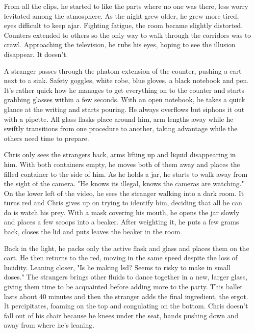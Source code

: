         From all the clips, he started to like the parts where no one was there, less worry levitated among the atmosphere. As the night grew
    older, he grew more tired, eyes difficult to keep ajar. Fighting fatigue, the room became slightly distorted. Counters extended to others so
    the only way to walk through the corridors was to crawl. Approaching the television, he rubs his eyes, hoping to see the illusion disappear.
    It doesn't.

        A stranger passes through the phatom extension of the counter, pushing a cart next to a sink. Safety goggles, white robe, blue gloves,
    a black notebook and pen. It's rather quick how he manages to get everything on to the counter and starts grabbing glasses within a few 
    seconds. With an open notebook, he takes a quick glance at the writing and starts pouring. He always overflows but siphons it out with a
    pipette.  All glass flasks place around him, arm lengths away while he swiftly transitions from one procedure to another, taking advantage
    while the others need time to prepare. 

        Chris only sees the strangers back, arms lifting up and liquid disappearing in him. With both containers empty, he moves both of them
    away and places the filled container to the side of him. As he holds a jar, he starts to walk away from the sight of the camera. "He knows
    its illegal, knows the cameras are watching." On the lower left of the video, he sees the stranger walking into a dark room. It turns red
    and Chris gives up on trying to identify him, deciding that all he can do is watch his prey. With a mask covering his mouth, he opens the
    jar slowly and places a few scoops into a beaker. After weighting it, he puts a few grams back, closes the lid and puts leaves the beaker in
    the room.

       Back in the light, he packs only the active flask and glass and places them on the cart. He then returns to the red, moving in the same
    speed despite the loss of lucidity. Leaning closer, "Is he making lsd? Seems to risky to make in small doses." The strangers brings other
    fluids to dance together in a new, larger glass, giving them time to be acquainted before adding more to the party. This ballet lasts about
    40 minutes and then the stranger adds the final ingredient, the ergot. It percipitates, foaming on the top and congulating on the bottom.
    Chris doesn't fall out of his chair because he knees under the seat, hands pushing down and away from where he's leaning.

